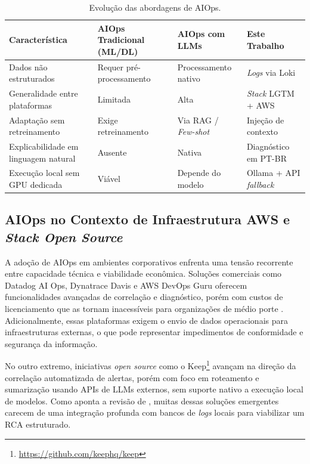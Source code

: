 \begin{table}[htb]
    \centering
    \caption{Evolução das abordagens de AIOps.}
    \label{tab:evolucao_aiops}
    \begin{tabular}{>{\raggedright\arraybackslash}p{3.8cm} >{\raggedright\arraybackslash}p{3.2cm} >{\raggedright\arraybackslash}p{3.2cm} >{\raggedright\arraybackslash}p{3.2cm}}
        \hline
        \textbf{Característica} & \textbf{AIOps Tradicional (ML/DL)} & \textbf{AIOps com LLMs} & \textbf{Este Trabalho} \\
        \hline
        Dados não estruturados & Requer pré-processamento & Processamento nativo & \textit{Logs} via Loki \\
        Generalidade entre plataformas & Limitada & Alta & \textit{Stack} LGTM + AWS \\
        Adaptação sem retreinamento & Exige retreinamento & Via RAG / \textit{Few-shot} & Injeção de contexto \\
        Explicabilidade em linguagem natural & Ausente & Nativa & Diagnóstico em PT-BR \\
        Execução local sem GPU dedicada & Viável & Depende do modelo & Ollama + API \textit{fallback} \\
        \hline
    \end{tabular}
\end{table}

\subsection{AIOps no Contexto de Infraestrutura AWS e \textit{Stack Open Source}}

A adoção de AIOps em ambientes corporativos enfrenta uma tensão recorrente entre capacidade técnica e viabilidade econômica. Soluções comerciais como Datadog AI Ops, Dynatrace Davis e AWS DevOps Guru oferecem funcionalidades avançadas de correlação e diagnóstico, porém com custos de licenciamento que as tornam inacessíveis para organizações de médio porte \cite{sharma2026top}. Adicionalmente, essas plataformas exigem o envio de dados operacionais para infraestruturas externas, o que pode representar impedimentos de conformidade e segurança da informação.

No outro extremo, iniciativas \textit{open source} como o Keep\footnote{\url{https://github.com/keephq/keep}} avançam na direção da correlação automatizada de alertas, porém com foco em roteamento e sumarização usando APIs de LLMs externos, sem suporte nativo a execução local de modelos. Como aponta a revisão de , muitas dessas soluções emergentes carecem de uma integração profunda com bancos de \textit{logs} locais para viabilizar um RCA estruturado.

